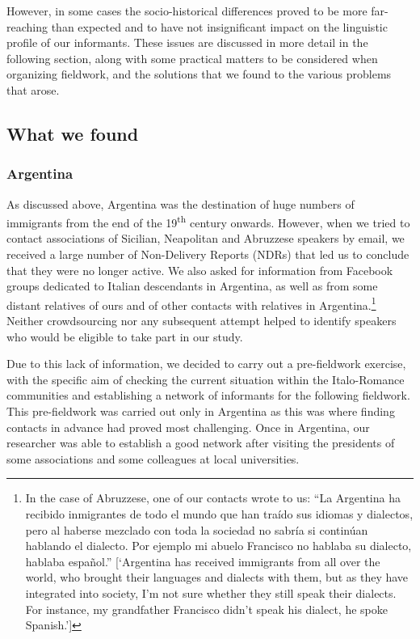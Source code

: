 \documentclass[output=paper,hidelinks]{langscibook}
\begin{document}
However, in some cases the socio-historical differences proved to be more far-reaching than expected and to have not insignificant impact on the linguistic profile of our informants. These issues are discussed in more detail in the following section, along with some practical matters to be considered when organizing fieldwork, and the solutions that we found to the various problems that arose.

\subsection{What we found}

\subsubsection{Argentina}

As discussed above, Argentina was the destination of huge numbers of immigrants from the end of the 19\textsuperscript{th} century onwards. However, when we tried to contact associations of Sicilian, Neapolitan and Abruzzese speakers by email, we received a large number of Non-Delivery Reports (NDRs) that led us to conclude that they were no longer active. We also asked for information from Facebook groups dedicated to Italian descendants in Argentina, as well as from some distant relatives of ours and of other contacts with relatives in Argentina.\footnote{In the case of Abruzzese, one of our contacts wrote to us: ``La Argentina ha recibido inmigrantes de todo el mundo que han traído sus idiomas y dialectos, pero al haberse mezclado con toda la sociedad no sabría si continúan hablando el dialecto. Por ejemplo mi abuelo Francisco no hablaba su dialecto, hablaba espa\~{n}ol.'' [`Argentina has received immigrants from all over the world, who brought their languages and dialects with them, but as they have integrated into society, I’m not sure whether they still speak their dialects. For instance, my grandfather Francisco didn’t speak his dialect, he spoke Spanish.']} Neither crowdsourcing nor any subsequent attempt helped to identify speakers who would be eligible to take part in our study.

Due to this lack of information, we decided to carry out a pre-fieldwork exercise, with the specific aim of checking the current situation within the Italo-Romance communities and establishing a network of informants for the following fieldwork. This pre-fieldwork was carried out only in Argentina as this was where finding contacts in advance had proved most challenging. Once in Argentina, our researcher was able to establish a good network after visiting the presidents of some associations and some colleagues at local universities.
\end{document}
